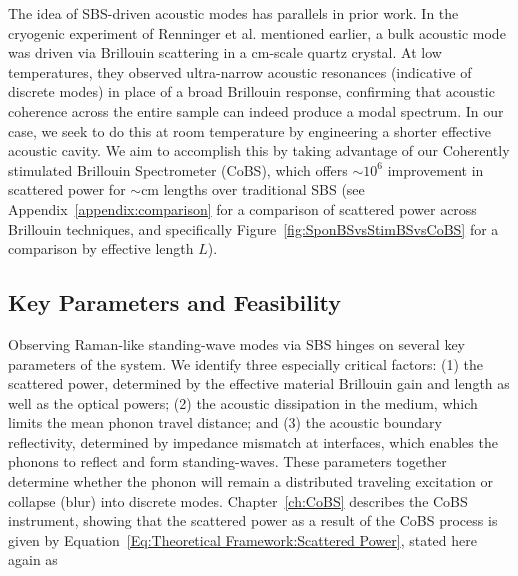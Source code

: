 The idea of \ac{SBS}-driven acoustic modes has parallels in prior work. In the cryogenic experiment of Renninger et al. mentioned earlier, \cite{renninger2018bulk} a bulk acoustic mode was driven via Brillouin scattering in a \si{\centi\meter}-scale quartz crystal. At low temperatures, they observed ultra-narrow acoustic resonances (indicative of discrete modes) in place of a broad Brillouin response, confirming that acoustic coherence across the entire sample can indeed produce a modal spectrum. In our case, we seek to do this at room temperature by engineering a shorter effective acoustic cavity. We aim to accomplish this by taking advantage of our Coherently stimulated Brillouin Spectrometer (\ac{CoBS}), which offers \(\sim10^{6}\) improvement in scattered power for \(\sim\)\si{\centi\meter} lengths over traditional \ac{SBS} (see Appendix~\ref{appendix:comparison} for a comparison of scattered power across Brillouin techniques, and specifically Figure~\ref{fig:SponBSvsStimBSvsCoBS} for a comparison by effective length \(L\)).

\subsection{Key Parameters and Feasibility}
\label{subsec:Raman:KeyParametersandFeasibility}

Observing Raman-like standing-wave modes via \ac{SBS} hinges on several key parameters of the system. We identify three especially critical factors: (1) the scattered power, determined by the effective material Brillouin gain and length as well as the optical powers; (2) the acoustic dissipation in the medium, which limits the mean phonon travel distance; and (3) the acoustic boundary reflectivity, determined by impedance mismatch at interfaces, which enables the phonons to reflect and form standing-waves. These parameters together determine whether the phonon will remain a distributed traveling excitation or collapse (blur) into discrete modes. Chapter~\ref{ch:CoBS} describes the \ac{CoBS} instrument, showing that the scattered power as a result of the \ac{CoBS} process is given by Equation~\ref{Eq:Theoretical Framework:Scattered Power}, stated here again as

